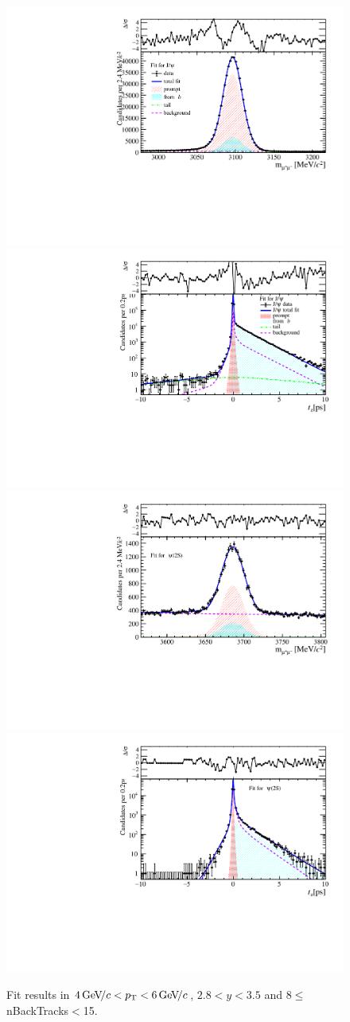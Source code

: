 \begin{figure}[H]
\begin{center}
\includegraphics[width=0.47\linewidth]{pdf/Jpsi/drawmassB/n2y2pt3.pdf}
\includegraphics[width=0.47\linewidth]{pdf/Jpsi/2DFitB/n2y2pt3.pdf}
\vspace*{-0.5cm}
\includegraphics[width=0.47\linewidth]{pdf/Psi2S/drawmassB/n2y2pt3.pdf}
\includegraphics[width=0.47\linewidth]{pdf/Psi2S/2DFitB/n2y2pt3.pdf}
\vspace*{-0.5cm}
\end{center}
\caption{Fit results in $4\text{\,Ge\kern -0.1em V\!/}c<p_{\mathrm{T}}<6\text{\,Ge\kern -0.1em V\!/}c$, $2.8<y<3.5$ and 8$\leq$nBackTracks$<$15.}
\label{Fitn2y2pt3}
\end{figure}
